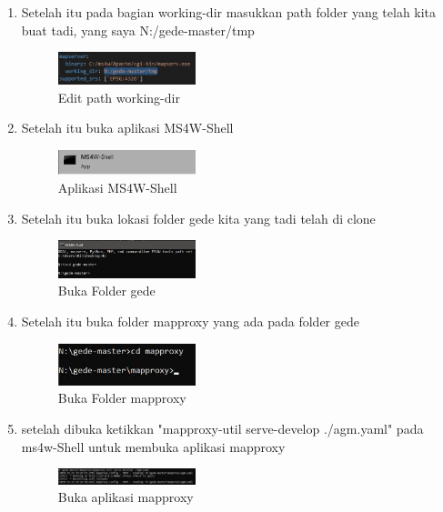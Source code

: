 \begin{enumerate}
  \item Setelah itu pada bagian working-dir masukkan path folder yang telah kita buat tadi, yang saya N:/gede-master/tmp
  \hfill\break
  \begin{figure}[H]
  \includegraphics[width=4cm]{figures/tugas4/1174066/16.jpg}
  \centering
  \caption{Edit path working-dir}
  \end{figure}

  \item Setelah itu buka aplikasi MS4W-Shell
  \hfill\break
  \begin{figure}[H]
  \includegraphics[width=4cm]{figures/tugas4/1174066/10.jpg}
  \centering
  \caption{Aplikasi MS4W-Shell}
  \end{figure}

  \item Setelah itu buka lokasi folder gede kita yang tadi telah di clone
  \hfill\break
  \begin{figure}[H]
  \includegraphics[width=4cm]{figures/tugas4/1174066/12.jpg}
  \centering
  \caption{Buka Folder gede}
  \end{figure}

  \item Setelah itu buka folder mapproxy yang ada pada folder gede
  \hfill\break
  \begin{figure}[H]
  \includegraphics[width=4cm]{figures/tugas4/1174066/17.jpg}
  \centering
  \caption{Buka Folder mapproxy}
  \end{figure}

  \item setelah dibuka ketikkan "mapproxy-util serve-develop ./agm.yaml" pada ms4w-Shell untuk membuka aplikasi mapproxy
  \hfill\break
  \begin{figure}[H]
  \includegraphics[width=4cm]{figures/tugas4/1174066/18.jpg}
  \centering
  \caption{Buka aplikasi mapproxy}
  \end{figure}
  

\end{enumerate}
